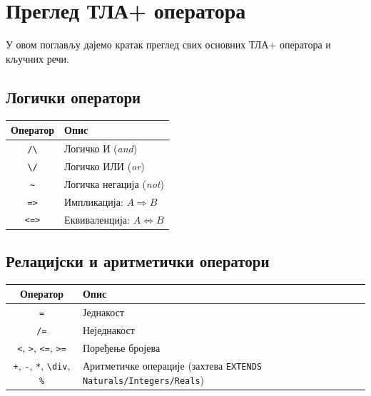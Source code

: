 \section{Преглед ТЛА+ оператора}

У овом поглављу дајемо кратак преглед свих основних ТЛА+ оператора и кључних речи.

\subsection{Логички оператори}
\begin{center}
\begin{tabularx}{\textwidth}{|c|X|}
\hline
\textbf{Оператор} & \textbf{Опис} \\
\hline
\texttt{/\textbackslash} & Логичко И (\textit{and}) \\
\texttt{\textbackslash/} & Логичко ИЛИ (\textit{or}) \\
\texttt{\textasciitilde} & Логичка негација (\textit{not}) \\
\texttt{=>}             & Импликација: $A \Rightarrow B$ \\
\texttt{<=>}            & Еквиваленција: $A \Leftrightarrow B$ \\
\hline
\end{tabularx}
\end{center}

\subsection{Релацијски и аритметички оператори}
\begin{center}
\begin{tabularx}{\textwidth}{|c|X|}
\hline
\textbf{Оператор} & \textbf{Опис} \\
\hline
\texttt{=}   & Једнакост \\
\texttt{/=}  & Неједнакост \\
\texttt{<}, \texttt{>}, \texttt{<=}, \texttt{>=} & Поређење бројева \\
\texttt{+}, \texttt{-}, \texttt{*}, \texttt{\textbackslash div}, \texttt{\%} & Аритметичке операције (захтева \texttt{EXTENDS Naturals/Integers/Reals}) \\
\hline
\end{tabularx}
\end{center}

